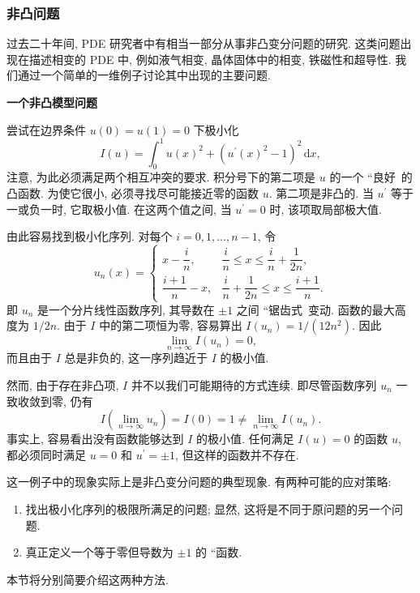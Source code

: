 \subsubsection{非凸问题}\label{subsec:nonconvex-variational-problems}

过去二十年间, PDE 研究者中有相当一部分从事非凸变分问题的研究. 这类问题出现在描述相变的 PDE 中, 例如液气相变, 晶体固体中的相变, 铁磁性和超导性. 我们通过一个简单的一维例子讨论其中出现的主要问题.

\textbf{一个非凸模型问题}

尝试在边界条件 $u(0)=u(1)=0$ 下极小化
\begin{equation}\label{eq:nonconvex-one-dimensional-model-energy}
I(u)=\int_0^1u(x)^2+(u^{\prime}(x)^2-1)^2\,\mathrm{d}x,
\end{equation}
注意, 为此必须满足两个相互冲突的要求. 积分号下的第二项是 $u$ 的一个 ``良好\textquotesingle\textquotesingle\ 的凸函数. 为使它很小, 必须寻找尽可能接近零的函数 $u$. 第二项是非凸的. 当 $u^{\prime}$ 等于一或负一时, 它取极小值. 在这两个值之间, 当 $u^{\prime}=0$ 时, 该项取局部极大值.

由此容易找到极小化序列. 对每个 $i=0,1,\ldots,n-1$, 令
\begin{equation}\label{eq:nonconvex-zigzag-minimizing-sequence}
u_n(x)=\begin{cases}x-\dfrac{i}{n},&\dfrac{i}{n}\leq x\leq\dfrac{i}{n}+\dfrac{1}{2n},\\\dfrac{i+1}{n}-x,&\dfrac{i}{n}+\dfrac{1}{2n}\leq x\leq\dfrac{i+1}{n}.\end{cases}
\end{equation}
即 $u_n$ 是一个分片线性函数序列, 其导数在 $\pm1$ 之间 ``锯齿式\textquotesingle\textquotesingle\ 变动. 函数的最大高度为 $1/2n$. 由于 $I$ 中的第二项恒为零, 容易算出 $I(u_n)=1/(12n^2)$. 因此\[\lim_{n\to\infty}I(u_n)=0,\]而且由于 $I$ 总是非负的, 这一序列趋近于 $I$ 的极小值.

然而, 由于存在非凸项, $I$ 并不以我们可能期待的方式连续. 即尽管函数序列 $u_n$ 一致收敛到零, 仍有\[I\left(\lim_{n\to\infty}u_n\right)=I(0)=1\neq\lim_{n\to\infty}I(u_n).\]事实上, 容易看出没有函数能够达到 $I$ 的极小值. 任何满足 $I(u)=0$ 的函数 $u$, 都必须同时满足 $u=0$ 和 $u^{\prime}=\pm1$, 但这样的函数并不存在.

这一例子中的现象实际上是非凸变分问题的典型现象. 有两种可能的应对策略:\begin{enumerate}\item 找出极小化序列的极限所满足的问题; 显然, 这将是不同于原问题的另一个问题.\item 真正定义一个等于零但导数为 $\pm1$ 的 ``函数\textquotesingle\textquotesingle.\end{enumerate}本节将分别简要介绍这两种方法.

